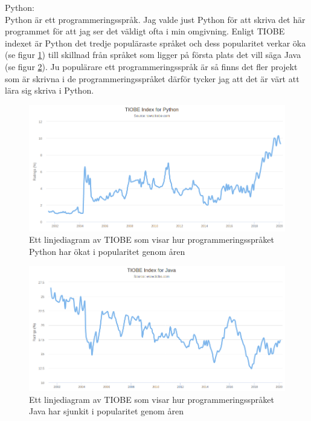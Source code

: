 \documentclass[a4paper, 12pt]{article}
\begin{document}
Python:\\
Python är ett programmeringsspråk.
Jag valde just Python för att skriva det här programmet för att jag ser det väldigt ofta i min omgivning.
Enligt TIOBE indexet \cite{TIOBE} är Python det tredje populäraste språket och dess popularitet verkar öka (se figur \ref{fig:index_python}) till skillnad från språket som ligger på första plats det vill säga Java (se figur \ref{fig:index_java}). Ju populärare ett programmeringsspråk är så finns det fler projekt som är skrivna i de programmeringsspråket därför tycker jag att det är värt att lära sig skriva i Python.


\begin{figure}[t!]
  \includegraphics[width=\linewidth]{img/TIOBE_python.png}
  \caption{Ett linjediagram av TIOBE som visar hur programmeringsspråket Python har ökat i popularitet genom åren}
  \label{fig:index_python}
\end{figure}
\begin{figure}[t!]
  \includegraphics[width=\linewidth]{img/TIOBE_java.png}
  \caption{Ett linjediagram av TIOBE som visar hur programmeringsspråket Java har sjunkit i popularitet genom åren}
  \label{fig:index_java}
\end{figure}
\end{document}
